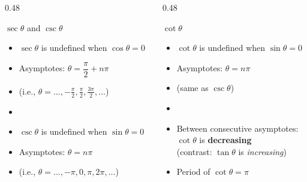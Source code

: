 \documentclass[aspectratio=169, 11pt]{beamer}
\begin{document}
\begin{frame}[t, plain]

  \begin{columns}[T]
    \begin{column}{0.48\textwidth}
      \begin{block}{$\sec\theta$ and $\csc\theta$}
        \begin{itemize}
          \item $\sec\theta$ is undefined when $\cos\theta = 0$
          \item[$\Rightarrow$] Asymptotes: $\theta = \dfrac{\pi}{2} + n\pi$
          \item[] (i.e., $\theta = \ldots, -\tfrac{\pi}{2}, \tfrac{\pi}{2}, \tfrac{3\pi}{2}, \ldots$)
          \item[\vspace{6pt}]{}
          \item $\csc\theta$ is undefined when $\sin\theta = 0$
          \item[$\Rightarrow$] Asymptotes: $\theta = n\pi$
          \item[] (i.e., $\theta = \ldots, -\pi, 0, \pi, 2\pi, \ldots$)
        \end{itemize}
      \end{block}
    \end{column}
    \begin{column}{0.48\textwidth}
      \begin{block}{$\cot\theta$}
        \begin{itemize}
          \item $\cot\theta$ is undefined when $\sin\theta = 0$
          \item[$\Rightarrow$] Asymptotes: $\theta = n\pi$
          \item[] (same as $\csc\theta$)
          \item[\vspace{6pt}]{}
          \item Between consecutive asymptotes:\\
            $\cot\theta$ is \textbf{decreasing}\\
            (contrast: $\tan\theta$ is \textit{increasing})
          \item Period of $\cot\theta = \pi$
        \end{itemize}
      \end{block}
    \end{column}
  \end{columns}
\end{frame}
\end{document}
